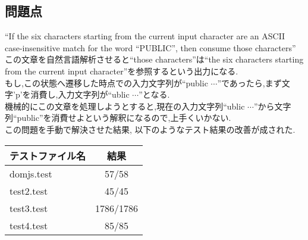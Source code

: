 \documentclass[uplatex,a4j]{jsreport}
\begin{document}
\subsection{問題点}
``If the six characters starting from the current input character are an ASCII case-insensitive match for the word ``PUBLIC'', then consume those characters''
この文章を自然言語解析させると``those characters''は``the six characters starting from the current input character''を参照するという出力になる.\\
もし,この状態へ遷移した時点での入力文字列が``public $\cdots$''であったら,まず文字'p'を消費し,入力文字列が``ublic $\cdots$''となる.\\
機械的にこの文章を処理しようとすると,現在の入力文字列``ublic $\cdots$''から文字列``public''を消費せよという解釈になるので,上手くいかない.\\
この問題を手動で解決させた結果, 以下のようなテスト結果の改善が成された.\\
\begin{table}[htb]
    \begin{tabular}{|l|c|} \hline
      テストファイル名 & 結果 \\ \hline 
      domjs.test & 57/58 \\
      test2.test & 45/45 \\
      test3.test & 1786/1786 \\
      test4.test & 85/85 \\ \hline 
    \end{tabular}
\end{table}
\end{document}
